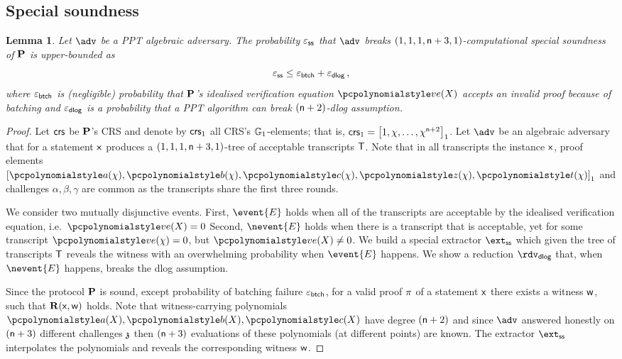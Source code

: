 \documentclass[runningheads,11pt]{llncs}
\newtheorem{lemma}[theorem]{Lemma}
\theoremstyle{definition}
\begin{document}
\subsection{Special soundness}
\begin{lemma}
	\label{lem:plonkprot_ss}
	Let $\adv$ be a PPT algebraic adversary. The probability $\varepsilon_{\mathsf{ss}}$ that $\adv$ breaks 
	 $(1, 1, 1, \mathsf{n} + 3, 1)$-computational special soundness of $\mathbf{P}$ is upper-bounded as
	 \[
	 	\varepsilon_{\mathsf{ss}} \leq \varepsilon_{\mathsf{btch}} + \varepsilon_{\mathsf{dlog}}\,,
	 \] 
	 where $\varepsilon_{\mathsf{btch}}$ is (negligible) probability that $\mathbf{P}$'s idealised verification equation $\vereq(X)$ accepts an invalid proof because of batching and $\varepsilon_{\mathsf{dlog}}$ is a probability that a PPT algorithm can break $(\mathsf{n} + 2)$-dlog assumption.
\end{lemma}
\begin{proof}
	Let $\mathsf{crs}$ be $\mathbf{P}$'s CRS and denote by $\mathsf{crs}_1$ all CRS's $\mathbb{G}_1$-elements; that is, $\mathsf{crs}_1 = \left[1, \chi, \ldots, \chi^{\mathsf{n} + 2}\right]_{1}$. 
	Let $\adv$ be an algebraic adversary that for a statement $\mathsf{x}$ produces a $(1, 1, 1, \mathsf{n} + 3, 1)$-tree of acceptable transcripts $\mathsf{T}$. %
	Note that in all transcripts the instance $\mathsf{x}$, proof elements $\gone{\p{a}(\chi), \p{b}(\chi), \p{c}(\chi), \p{z}(\chi), \p{t}(\chi)}$ and challenges $\alpha, \beta, \gamma$ are common as the transcripts share the first three rounds. 
	
	We consider two mutually disjunctive events. 
	First, $\event{E}$ holds when all of the transcripts are acceptable by the idealised verification equation, i.e.~$\vereq(X) = 0$ 
	Second, $\nevent{E}$ holds when there is a transcript that is acceptable, yet 
	for some transcript $\vereq(\chi) = 0$, but $\vereq(X) \neq 0$.
	We build a special extractor $\extss$ which given the tree of transcripts $\mathsf{T}$ reveals the witness with an overwhelming probability when $\event{E}$ happens. 
	We show a reduction $\rdvdlog$ that, when $\nevent{E}$ happens, breaks the dlog assumption. 
	
	  Since the protocol $\mathbf{P}$ is sound,
	except probability of batching failure $\varepsilon_{\mathsf{btch}}$, for a valid proof
	$\pi$ of a statement $\mathsf{x}$ there exists a witness $\mathsf{w}$, such that
	$\mathbf{R}(\mathsf{x}, \mathsf{w})$ holds.  Note that witness-carrying polynomials $\p{a}(X),
	\p{b}(X), \p{c}(X)$ have degree $(\mathsf{n} + 2)$ and since $\adv$
	answered honestly on $(\mathsf{n} + 3)$ different challenges $\mathfrak{z}$
	then $(\mathsf{n} + 3)$ evaluations of these polynomials (at
	different points) are known. The extractor $\extss$ interpolates the
	polynomials and reveals the corresponding witness $\mathsf{w}$. 
	

\end{proof}
\end{document}
